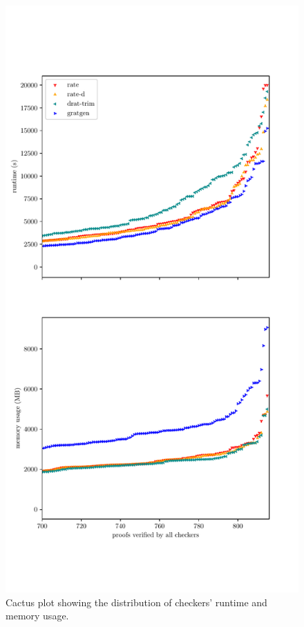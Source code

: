 \documentclass[
]{report}
\begin{document}
\begin{figure}
\centerline{\includegraphics[width=2\textwidth,height=.9\textheight,keepaspectratio]{p/cactus.pdf}}
\caption{Cactus plot showing the distribution of checkers' runtime and memory usage.\label{fig:cactus}}
\end{figure}
\end{document}
